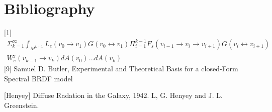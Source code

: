 \message{ !name(test.tex)}\documentclass{article}
\begin{document}
  \section{Bibliography}
  [1]
  \begin{align*}
    \Sigma_{k=1}^{\infty} \int_{M^{k+1}} L_e(v_0 \rightarrow v_1) G(v_0
    \leftrightarrow v_1)
    \Pi_{i=1}^{k-1} F_s(v_{i-1} \rightarrow v_i \rightarrow v_{i+1}) G(v_i
    \leftrightarrow v_{i+1})\\
    W_e^j(v_{k-1} \rightarrow v_k) dA(v_0) \ldots dA(v_k)
  \end{align*}
  [9]
  Samuel D. Butler, Experimental and Theoretical Basis for a closed-Form Spectral BRDF model
  
  [Henyey]
   Diffuse Radation in the Galaxy, 1942. L, G. Henyey and J. L. Greenstein. 
\end{document}
